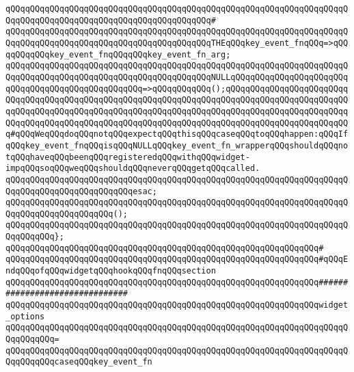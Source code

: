 \verb|qQQqqQQqqQQqqQQqqQQqqQQqqQQqqQQqqQQqqQQqqQQqqQQqqQQqqQQqqQQqqQQqqQQqqQQqqQQqqQQqqQQqqQQqqQQqqQQqqQQqqQQqqQQqqQQq#|\newline
\verb|qQQqqQQqqQQqqQQqqQQqqQQqqQQqqQQqqQQqqQQqqQQqqQQqqQQqqQQqqQQqqQQqqQQqqQQqqQQqqQQqqQQqqQQqqQQqqQQqqQQqqQQqqQQqqQQqTHEqQQqkey_event_fnqQQq=>qQQqqQQqqQQqkey_event_fnqQQqqQQqkey_event_fn_arg;|\newline
\verb|qQQqqQQqqQQqqQQqqQQqqQQqqQQqqQQqqQQqqQQqqQQqqQQqqQQqqQQqqQQqqQQqqQQqqQQqqQQqqQQqqQQqqQQqqQQqqQQqqQQqqQQqqQQqqQQqNULLqQQqqQQqqQQqqQQqqQQqqQQqqQQqqQQqqQQqqQQqqQQqqQQqqQQq=>qQQqqQQqqQQq();qQQqqQQqqQQqqQQqqQQqqQQqqQQqqQQqqQQqqQQqqQQqqQQqqQQqqQQqqQQqqQQqqQQqqQQqqQQqqQQqqQQqqQQqqQQqqQQqqQQqqQQqqQQqqQQqqQQqqQQqqQQqqQQqqQQqqQQqqQQqqQQqqQQqqQQqqQQqqQQqqQQqqQQqqQQqqQQqqQQqqQQqqQQqqQQqqQQqqQQqqQQqqQQqqQQqqQQqqQQqqQQqqQQqqQQqqQQq#qQQqWeqQQqdoqQQqnotqQQqexpectqQQqthisqQQqcaseqQQqtoqQQqhappen:qQQqIfqQQqkey_event_fnqQQqisqQQqNULLqQQqkey_event_fn_wrapperqQQqshouldqQQqnotqQQqhaveqQQqbeenqQQqregisteredqQQqwithqQQqwidget-impqQQqsoqQQqweqQQqshouldqQQqneverqQQqgetqQQqcalled.|\newline
\verb|qQQqqQQqqQQqqQQqqQQqqQQqqQQqqQQqqQQqqQQqqQQqqQQqqQQqqQQqqQQqqQQqqQQqqQQqqQQqqQQqqQQqqQQqqQQqqQQqesac;|\newline
\newline
\verb|qQQqqQQqqQQqqQQqqQQqqQQqqQQqqQQqqQQqqQQqqQQqqQQqqQQqqQQqqQQqqQQqqQQqqQQqqQQqqQQqqQQqqQQqqQQq();|\newline
\verb|qQQqqQQqqQQqqQQqqQQqqQQqqQQqqQQqqQQqqQQqqQQqqQQqqQQqqQQqqQQqqQQqqQQqqQQqqQQqqQQq};|\newline
\newline
\newline
\verb|qQQqqQQqqQQqqQQqqQQqqQQqqQQqqQQqqQQqqQQqqQQqqQQqqQQqqQQqqQQqqQQq#|\newline
\verb|qQQqqQQqqQQqqQQqqQQqqQQqqQQqqQQqqQQqqQQqqQQqqQQqqQQqqQQqqQQqqQQq#qQQqEndqQQqofqQQqwidgetqQQqhookqQQqfnqQQqsection|\newline
\verb|qQQqqQQqqQQqqQQqqQQqqQQqqQQqqQQqqQQqqQQqqQQqqQQqqQQqqQQqqQQqqQQq###############################|\newline
\newline
\verb|qQQqqQQqqQQqqQQqqQQqqQQqqQQqqQQqqQQqqQQqqQQqqQQqqQQqqQQqqQQqqQQqwidget_options|\newline
\verb|qQQqqQQqqQQqqQQqqQQqqQQqqQQqqQQqqQQqqQQqqQQqqQQqqQQqqQQqqQQqqQQqqQQqqQQqqQQqqQQq=|\newline
\verb|qQQqqQQqqQQqqQQqqQQqqQQqqQQqqQQqqQQqqQQqqQQqqQQqqQQqqQQqqQQqqQQqqQQqqQQqqQQqqQQqcaseqQQqkey_event_fn|\newline
